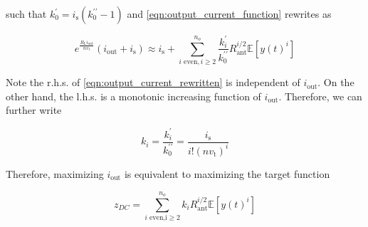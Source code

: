 such that $k_0^\prime  = {i_{\text{s}}}(k_0^{\prime \prime } - 1)$ and \eqref{eqn:output_current_function} rewrites as

\begin{equation}\label{eqn:output_current_rewritten}
  {e^{\frac{{{R_{\text{L}}}{i_{{\text{out}}}}}}{{n{v_{\text{t}}}}}}}\left( {{i_{{\text{out}}}} + {i_{\text{s}}}} \right) \approx {i_{\text{s}}} + \sum\limits_{i{\text{ even}},i \geqslant 2}^{{n_o}} {\frac{{k_i^\prime }}{{k_0^{\prime \prime }}}} R_{{\text{ant}}}^{i/2}\mathbb{E}\left[ {y{{(t)}^i}} \right]
\end{equation}

Note the r.h.s. of \eqref{eqn:output_current_rewritten} is independent of ${i_{{\text{out}}}}$. On the other hand, the l.h.s. is a monotonic increasing function of ${i_{{\text{out}}}}$. Therefore, we can further write

\begin{equation}\label{eqn:diode_k}
  {k_i} = \frac{{k_i^\prime }}{{k_0^{\prime \prime }}} = \frac{{{i_{\text{s}}}}}{{i!{{\left( {n{v_{\text{t}}}} \right)}^i}}}
\end{equation}

Therefore, maximizing ${i_{{\text{out}}}}$ is equivalent to maximizing the target function

\begin{equation}\label{eqn:target_function}
  {z_{DC}} = \sum\limits_{i{\text{ even,i}} \geqslant 2}^{{n_o}} {{k_i}} R_{{\text{ant}}}^{i/2}\mathbb{E}\left[ {y{{(t)}^i}} \right]
\end{equation}
